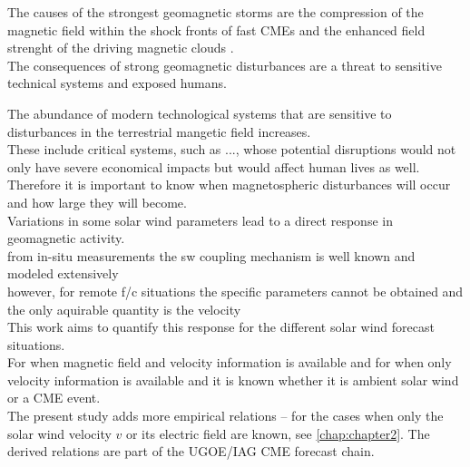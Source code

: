 The causes of the strongest geomagnetic storms are the compression of the magnetic field within the shock fronts of fast CMEs and the enhanced field strenght of the driving magnetic clouds \citep{Bothmer1993,Bothmer1995}.\\





The consequences of strong geomagnetic disturbances are a threat to sensitive technical systems and exposed humans.

The abundance of modern technological systems that are sensitive to disturbances in the terrestrial mangetic field increases.\\
These include critical systems, such as ..., whose potential disruptions would not only have severe economical impacts but would affect human lives as well.\\

Therefore it is important to know when magnetospheric disturbances will occur and how large they will become.\\

Variations in some solar wind parameters lead to a direct response in geomagnetic activity.\\

from in-situ measurements the sw coupling mechanism is well known and modeled extensively\\


however, for remote f/c situations the specific parameters cannot be obtained and the only aquirable quantity is the velocity\\



This work aims to quantify this response for the different solar wind forecast situations.\\

For when magnetic field and velocity information is available and for when only velocity information is available and it is known whether it is ambient solar wind or a CME event.\\

The present study adds more empirical \Kp{} relations -- for the cases when only the solar wind velocity $v$ or its electric field \vBz{} are known, see \autoref{chap:chapter2}. The derived \Kp{} relations are part of the UGOE/IAG CME forecast chain.\\

